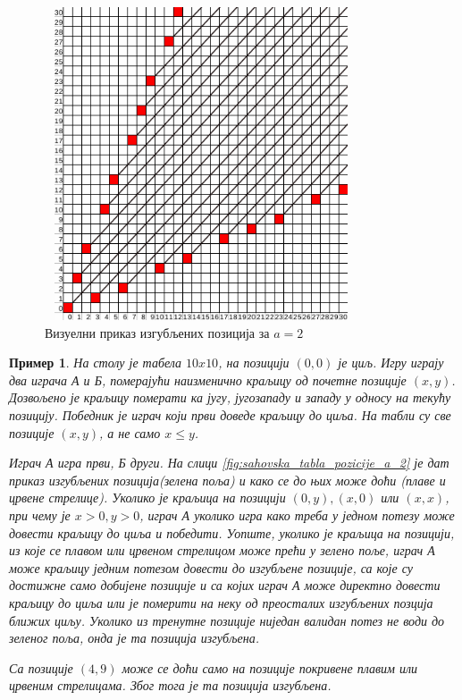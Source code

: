 \documentclass[a4paper]{article}
\newtheorem{example}{Пример}
\begin{document}
\begin{figure}[H]
	\caption{Визуелни приказ изгубљених позиција за $ a = 2 $}
	\label{fig:p_positions_a=2}
	\begin{center}
		\includegraphics[width=350px, height=350px]{p_positions_a=2.png}
	\end{center}
\end{figure}

\begin{example}
	На столу је табела $ 10x10 $, на позицији $ (0, 0) $ је циљ. Игру играју два играча \textit{А} и \textit{Б}, померајући наизменично краљицу од почетне позиције $ (x,y) $. Дозвољено је краљицу померати ка југу, југозападу и западу у односу на текућу позицију.  Победник је играч који први доведе краљицу до циља. На табли су све позиције $ (x, y) $, а не само $ x \leq y $.
	
	Играч \textit{А} игра први, \textit{Б} други. На слици \ref{fig:sahovska_tabla_pozicije_a_2} је дат приказ изгубљених позиција(зелена поља) и како се до њих може доћи (плаве и црвене стрелице). Уколико је краљица на позицији $ (0, y), (x,0) $ или $ (x,x) $, при чему је $ x > 0, y > 0 $, играч \textit{А} уколико игра како треба у једном потезу може довести краљицу до циља и победити. Уопште, уколико је краљица на позицији, из које се плавом или црвеном стрелицом може прећи у зелено поље, играч \textit{А} може краљицу једним потезом довести до изгубљене позиције, са које су достижне само добијене позиције и са којих играч \textit{А} може директно довести краљицу до циља или је померити на неку од преосталих изгубљених позција ближих циљу. Уколико из тренутне позиције ниједан валидан потез не води до зеленог поља, онда је та позиција изгубљена. 
	
	Са позиције $ (4, 9) $ може се доћи само на позиције покривене плавим или црвеним стрелицама. Због тога је та позиција изгубљена.
\end{example}
 
\end{document}
